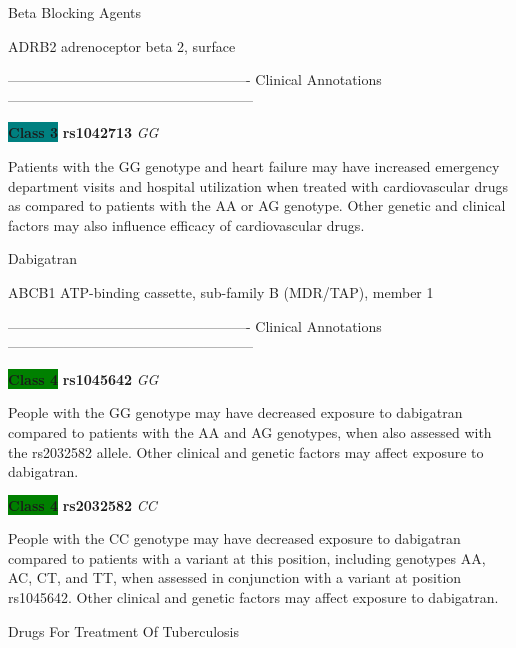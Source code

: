 \documentclass{resume} %
\begin{document}
\begin{rSection}{ Beta Blocking Agents }
\begin{rSubsection}{ ADRB2 }{ adrenoceptor beta 2, surface }{}{}
\item[] ---------------------------------------------------- Clinical Annotations -----------------------------------------------------\newline
\item \textbf{\colorbox{teal} {Class 3}} \textbf{ rs1042713 } \textit{ GG }
\item[] Patients with the GG genotype and heart failure may have increased emergency department visits and hospital utilization when treated with cardiovascular drugs as compared to patients with the AA or AG genotype. Other genetic and clinical factors may also influence efficacy of cardiovascular drugs.
\end{rSubsection}

\end{rSection}\begin{rSection}{ Dabigatran }
\item[]

\begin{rSubsection}{ ABCB1 }{ ATP-binding cassette, sub-family B (MDR/TAP), member 1 }{}{}
\item[]

\item[] ---------------------------------------------------- Clinical Annotations -----------------------------------------------------\newline
\item \textbf{\colorbox{green} {Class 4}} \textbf{ rs1045642 } \textit{ GG }
\item[] People with the GG genotype may have decreased exposure to dabigatran compared to patients with the AA and AG genotypes, when also assessed with the rs2032582 allele. Other clinical and genetic factors may affect exposure to dabigatran.\item \textbf{\colorbox{green} {Class 4}} \textbf{ rs2032582 } \textit{ CC }
\item[] People with the CC genotype may have decreased exposure to dabigatran compared to patients with a variant at this position, including genotypes AA, AC, CT, and TT, when assessed in conjunction with a variant at position rs1045642. Other clinical and genetic factors may affect exposure to dabigatran. 
\end{rSubsection}

\end{rSection}\begin{rSection}{ Drugs For Treatment Of Tuberculosis }
\item[]


\end{rSection}
\end{document}
